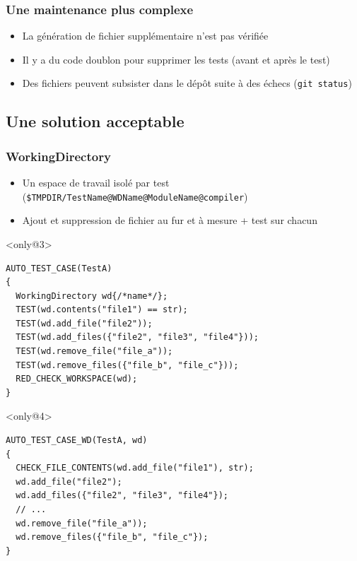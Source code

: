 \documentclass{beamer}
\begin{document}
\begin{frame}[fragile]
\frametitle{Une maintenance plus complexe}

\begin{itemize}[<+->]
 \item La génération de fichier supplémentaire n'est pas vérifiée
 \item Il y a du code doublon pour supprimer les tests (avant et après le test)
 \item Des fichiers peuvent subsister dans le dépôt suite à des échecs (\lstinline|git status|)
\end{itemize}
\end{frame}


\subsection{Une solution acceptable}


\begin{frame}[fragile]
\frametitle{WorkingDirectory}

\begin{itemize}[<+->]
 \item Un espace de travail isolé par test (\lstinline{$TMPDIR/TestName@WDName@ModuleName@compiler})
 \item Ajout et suppression de fichier au fur et à mesure + test sur chacun
\end{itemize}

\begin{exampleblock}{}<only@3>
\begin{lstlisting}
AUTO_TEST_CASE(TestA)
{
  WorkingDirectory wd{/*name*/};
  TEST(wd.contents("file1") == str);
  TEST(wd.add_file("file2"));
  TEST(wd.add_files({"file2", "file3", "file4"}));
  TEST(wd.remove_file("file_a"));
  TEST(wd.remove_files({"file_b", "file_c"}));
  RED_CHECK_WORKSPACE(wd);
}
\end{lstlisting}
\end{exampleblock}

\begin{exampleblock}{}<only@4>
\begin{lstlisting}
AUTO_TEST_CASE_WD(TestA, wd)
{
  CHECK_FILE_CONTENTS(wd.add_file("file1"), str);
  wd.add_file("file2");
  wd.add_files({"file2", "file3", "file4"});
  // ...
  wd.remove_file("file_a"));
  wd.remove_files({"file_b", "file_c"});
}
\end{lstlisting}
\end{exampleblock}
\end{frame}
\end{document}
